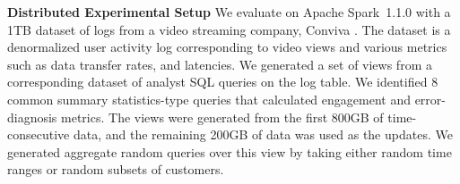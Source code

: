 \noindent\textbf{Distributed Experimental Setup}
We evaluate \svc on Apache Spark~1.1.0 with a 1TB dataset of logs from a video streaming company, Conviva \cite{conviva}.
The dataset is a denormalized user activity log corresponding to video views and various metrics such as data transfer rates, and latencies.
We generated a set of views from a corresponding dataset of analyst SQL queries on the log table.
We identified 8 common summary statistics-type queries that calculated engagement and error-diagnosis metrics.
The views were generated from the first 800GB of time-consecutive data, and the remaining 200GB of data was used as the updates.
We generated aggregate random queries over this view by taking either random time ranges or random subsets of customers.



